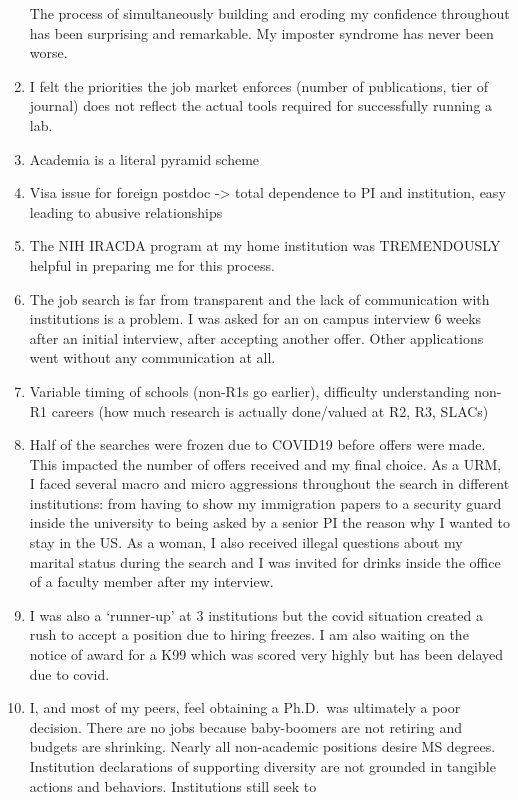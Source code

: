 \documentclass[]{article}
\begin{document}
\begin{enumerate}
  The process of simultaneously building and eroding my confidence
  throughout has been surprising and remarkable. My imposter syndrome
  has never been worse.
\item
  I felt the priorities the job market enforces (number of publications,
  tier of journal) does not reflect the actual tools required for
  successfully running a lab.
\item
  Academia is a literal pyramid scheme
\item
  Visa issue for foreign postdoc -\textgreater{} total dependence to PI
  and institution, easy leading to abusive relationships
\item
  The NIH IRACDA program at my home institution was TREMENDOUSLY helpful
  in preparing me for this process.
\item
  The job search is far from transparent and the lack of communication
  with institutions is a problem. I was asked for an on campus interview
  6 weeks after an initial interview, after accepting another offer.
  Other applications went without any communication at all.
\item
  Variable timing of schools (non-R1s go earlier), difficulty
  understanding non-R1 careers (how much research is actually
  done/valued at R2, R3, SLACs)
\item
  Half of the searches were frozen due to COVID19 before offers were
  made. This impacted the number of offers received and my final choice.
  As a URM, I faced several macro and micro aggressions throughout the
  search in different institutions: from having to show my immigration
  papers to a security guard inside the university to being asked by a
  senior PI the reason why I wanted to stay in the US. As a woman, I
  also received illegal questions about my marital status during the
  search and I was invited for drinks inside the office of a faculty
  member after my interview.
\item
  I was also a `runner-up' at 3 institutions but the covid situation
  created a rush to accept a position due to hiring freezes. I am also
  waiting on the notice of award for a K99 which was scored very highly
  but has been delayed due to covid.
\item
  I, and most of my peers, feel obtaining a Ph.D.~was ultimately a poor
  decision. There are no jobs because baby-boomers are not retiring and
  budgets are shrinking. Nearly all non-academic positions desire MS
  degrees. Institution declarations of supporting diversity are not
  grounded in tangible actions and behaviors. Institutions still seek to

\end{enumerate}
\end{document}
